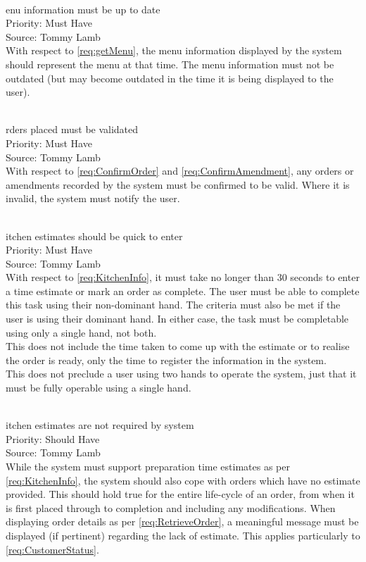 \documentclass[11pt, a4paper]{report}
\def\itempar#1\\{\item \textbf{#1}\\} %
\begin{document}
\begin{enumerate}[label=NF-UR-\arabic*, series=nonfunctional]
\begin{enumerate}[label*=.\arabic*]
\end{enumerate}

\itempar Menu information must be up to date\\
Priority: Must Have\\
Source: Tommy Lamb\\
With respect to \autoref{req:getMenu}, the menu information displayed by the system should represent the menu at that time. The menu information must not be outdated (but may become outdated in the time it is being displayed to the user).

\itempar Orders placed must be validated\\
Priority: Must Have\\
Source: Tommy Lamb\\
With respect to \autoref{req:ConfirmOrder} and \autoref{req:ConfirmAmendment}, any orders or amendments recorded by the system must be confirmed to be valid. Where it is invalid, the system must notify the user.

\itempar Kitchen estimates should be quick to enter\\
Priority: Must Have\\
Source: Tommy Lamb\\
With respect to \autoref{req:KitchenInfo}, it must take no longer than 30 seconds to enter a time estimate or mark an order as complete. The user must be able to complete this task using their non-dominant hand. The criteria must also be met if the user is using their dominant hand. In either case, the task must be completable using only a single hand, not both.\\
This does not include the time taken to come up with the estimate or to realise the order is ready, only the time to register the information in the system.\\
This does not preclude a user using two hands to operate the system, just that it must be fully operable using a single hand.

\itempar Kitchen estimates are not required by system\\
Priority: Should Have\\
Source: Tommy Lamb\\
While the system must support preparation time estimates as per \autoref{req:KitchenInfo}, the system should also cope with orders which have no estimate provided. This should hold true for the entire life-cycle of an order, from when it is first placed through to completion and including any modifications. When displaying order details as per \autoref{req:RetrieveOrder}, a meaningful message must be displayed (if pertinent) regarding the lack of estimate. This applies particularly to \autoref{req:CustomerStatus}.


\end{enumerate}
\end{document}
